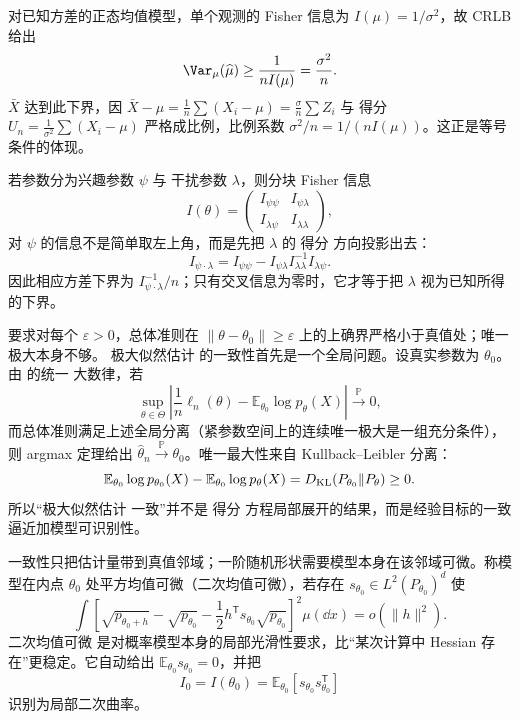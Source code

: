 \begin{workedexample}[正态均值达到有限样本界]
对已知方差的正态均值模型，单个观测的 Fisher 信息为 $I(\mu)=1/\sigma^2$，故 CRLB 给出
\[
\Var_\mu(\widehat\mu)\ge\frac{1}{nI(\mu)}=\frac{\sigma^2}{n}.
\]
$\bar X$ 达到此下界，因 $\bar X-\mu=\frac1n\sum(X_i-\mu)=\frac{\sigma}{n}\sum Z_i$ 与 得分 $U_n=\frac1{\sigma^2}\sum(X_i-\mu)$ 严格成比例，比例系数 $\sigma^2/n=1/(nI(\mu))$。这正是等号条件的体现。
\end{workedexample}

\begin{proposition}
若参数分为兴趣参数 $\psi$ 与 干扰参数 $\lambda$，则分块 Fisher 信息
\[
I(\theta)=\begin{pmatrix}I_{\psi\psi}&I_{\psi\lambda}\\I_{\lambda\psi}&I_{\lambda\lambda}\end{pmatrix},
\]
对 $\psi$ 的信息不是简单取左上角，而是先把 $\lambda$ 的 得分 方向投影出去：
\[
 I_{\psi\cdot\lambda}
 =I_{\psi\psi}-I_{\psi\lambda}I_{\lambda\lambda}^{-1}I_{\lambda\psi}.
\]
因此相应方差下界为 $I_{\psi\cdot\lambda}^{-1}/n$；只有交叉信息为零时，它才等于把 $\lambda$ 视为已知所得的下界。
\end{proposition}

\begin{theorem}
要求对每个 $\varepsilon>0$，总体准则在 $\|\theta-\theta_0\|\ge\varepsilon$ 上的上确界严格小于真值处；唯一极大本身不够。
极大似然估计 的一致性首先是一个全局问题。设真实参数为 $\theta_0$。由  的统一 大数律，若
\[
 \sup_{\theta\in\Theta}
 \left|
 \frac1n\ell_n(\theta)
 -\mathbb E_{\theta_0}\log p_\theta(X)
 \right|\xrightarrow{\mathbb P}0,
\]
而总体准则满足上述全局分离（紧参数空间上的连续唯一极大是一组充分条件），则 argmax 定理给出 $\widehat\theta_n\xrightarrow{\mathbb P}\theta_0$。唯一最大性来自 Kullback--Leibler 分离：
\[
 \mathbb E_{\theta_0}\log p_{\theta_0}(X)
 -\mathbb E_{\theta_0}\log p_\theta(X)
 =D_{\rm KL}(P_{\theta_0}\Vert P_\theta)\ge0.
\]
所以“极大似然估计 一致”并不是 得分 方程局部展开的结果，而是经验目标的一致逼近加模型可识别性。
\end{theorem}

\begin{definition}[二次均值可微]
一致性只把估计量带到真值邻域；一阶随机形状需要模型本身在该邻域可微。称模型在内点 $\theta_0$ 处平方均值可微（二次均值可微），若存在 $s_{\theta_0}\in L^2(P_{\theta_0})^d$ 使
\begin{equation*}\int\left[
 \sqrt{p_{\theta_0+h}}
 -\sqrt{p_{\theta_0}}
 -\frac12h^{\mathsf T}s_{\theta_0}\sqrt{p_{\theta_0}}
 \right]^2\mu(\dd x)
 =o(\|h\|^2).
\end{equation*}
二次均值可微 是对概率模型本身的局部光滑性要求，比“某次计算中 Hessian 存在”更稳定。它自动给出 $\mathbb E_{\theta_0}s_{\theta_0}=0$，并把
\[
 I_0=I(\theta_0)
 =\mathbb E_{\theta_0}[s_{\theta_0}s_{\theta_0}^{\mathsf T}]
\]
识别为局部二次曲率。
\end{definition}

